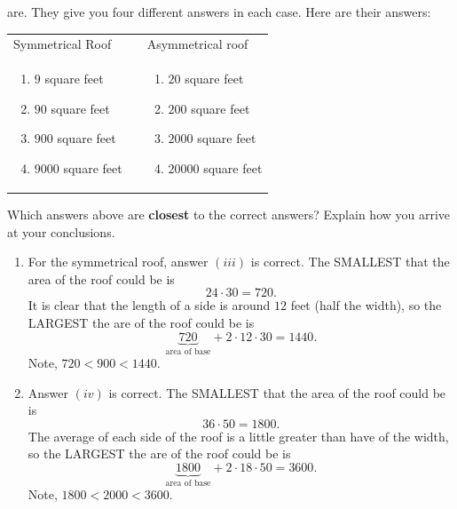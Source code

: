 \documentclass[handout,nooutcomes,noauthor,hints]{ximera}
\begin{document}
\begin{question}
  are. They give you four different answers in each case. Here are
  their answers:
  \begin{center}
    \begin{tabular}{lll}
      Symmetrical Roof &\hspace{1in} & Asymmetrical roof\\
    \begin{minipage}{2in}\begin{enumerate}
    \item $9$ square feet
    \item $90$ square feet
    \item $900$ square feet
    \item $9000$ square feet
    \end{enumerate} 
    \end{minipage}
    & &
    \begin{minipage}{2in} \begin{enumerate}
    \item $20$ square feet
    \item $200$ square feet
    \item $2000$ square feet
    \item $20000$ square feet
      \end{enumerate}
    \end{minipage}
    \end{tabular}
  \end{center}
  Which answers above are \textbf{closest} to the correct answers?
  Explain how you arrive at your conclusions.
  \begin{freeResponse}
    \begin{enumerate}
    \item For the symmetrical roof, answer $(iii)$ is correct. The
      SMALLEST that the area of the roof could be is
      \[
      24\cdot 30 = 720.
      \]
      It is clear that the length of a side is around $12$ feet (half the width), so
      the LARGEST the are of the roof could be is
      \[
      \underbrace{720}_{\text{area of base}} + 2\cdot 12\cdot 30 = 1440.
      \]
      Note, $720 < 900 < 1440$.
    \item Answer $(iv)$ is correct.  The SMALLEST that the area of the
      roof could be is
      \[
      36\cdot 50 = 1800.
      \]
      The average of each side of the roof is a little greater than
      have of the width, so the LARGEST the are of the roof could be
      is
      \[
      \underbrace{1800}_{\text{area of base}} + 2\cdot 18\cdot 50 = 3600.
      \]
      Note, $1800 < 2000 < 3600$.
    \end{enumerate}
  \end{freeResponse}
\end{question}
\mynewpage
\end{document}

